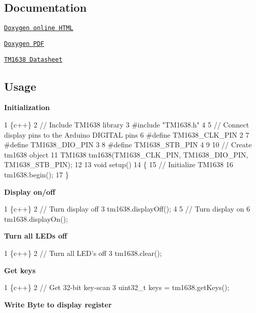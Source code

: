 \subsection*{Documentation}


\begin{DoxyItemize}
\item \href{https://Erriez.github.io/ErriezTM1638}{\tt Doxygen online H\+T\+ML}
\item \href{https://github.com/Erriez/ErriezTM1638/raw/gh-pages/latex/ErriezTM1638.pdf}{\tt Doxygen P\+DF}
\item \href{https://github.com/Erriez/ErriezTM1638/blob/master/extras/TM1638_datasheet.pdf}{\tt T\+M1638 Datasheet}
\end{DoxyItemize}

\subsection*{Usage}

{\bfseries Initialization}


\begin{DoxyCode}
1 \{c++\}
2 // Include TM1638 library
3 #include "TM1638.h"
4 
5 // Connect display pins to the Arduino DIGITAL pins
6 #define TM1638\_CLK\_PIN   2
7 #define TM1638\_DIO\_PIN   3
8 #define TM1638\_STB\_PIN   4
9 
10 // Create tm1638 object
11 TM1638 tm1638(TM1638\_CLK\_PIN, TM1638\_DIO\_PIN, TM1638\_STB\_PIN);
12 
13 void setup()
14 \{
15     // Initialize TM1638
16     tm1638.begin();
17 \}
\end{DoxyCode}


{\bfseries Display on/off}


\begin{DoxyCode}
1 \{c++\}
2 // Turn display off
3 tm1638.displayOff();
4 
5 // Turn display on
6 tm1638.displayOn();
\end{DoxyCode}


{\bfseries Turn all L\+ED\textquotesingle{}s off}


\begin{DoxyCode}
1 \{c++\}
2 // Turn all LED's off
3 tm1638.clear();
\end{DoxyCode}


{\bfseries Get keys}


\begin{DoxyCode}
1 \{c++\}
2 // Get 32-bit key-scan
3 uint32\_t keys = tm1638.getKeys();
\end{DoxyCode}


{\bfseries Write Byte to display register}


